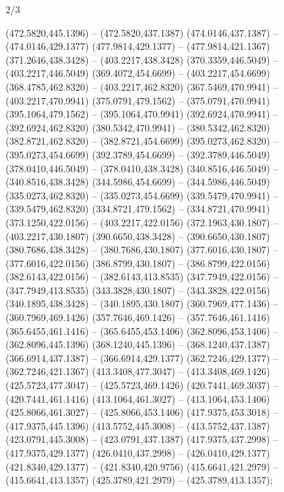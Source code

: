 \begin{flagdescription}{2/3}
\begin{scope}[xshift=0.5\flaglength,yshift=0.5\flagwidth,scale=\flagwidth/562]
\begin{scope}[y=1pt, x=1pt, yscale=-1,shift={(-421.88,-281.25)}]
 (472.5820,445.1396) -- (472.5820,437.1387) (474.0146,437.1387) -- (474.0146,429.1377)
 (477.9814,429.1377) -- (477.9814,421.1367) (371.2646,438.3428) -- (403.2217,438.3428)
 (370.3359,446.5049) -- (403.2217,446.5049) (369.4072,454.6699) -- (403.2217,454.6699)
 (368.4785,462.8320) -- (403.2217,462.8320) (367.5469,470.9941) -- (403.2217,470.9941)
 (375.0791,479.1562) -- (375.0791,470.9941) (395.1064,479.1562) -- (395.1064,470.9941)
 (392.6924,470.9941) -- (392.6924,462.8320) (380.5342,470.9941) -- (380.5342,462.8320)
 (382.8721,462.8320) -- (382.8721,454.6699) (395.0273,462.8320) -- (395.0273,454.6699)
 (392.3789,454.6699) -- (392.3789,446.5049) (378.0410,446.5049) -- (378.0410,438.3428)
 (340.8516,446.5049) -- (340.8516,438.3428) (344.5986,454.6699) -- (344.5986,446.5049)
 (335.0273,462.8320) -- (335.0273,454.6699) (339.5479,470.9941) -- (339.5479,462.8320)
 (334.8721,479.1562) -- (334.8721,470.9941) (373.1250,422.0156) -- (403.2217,422.0156)
 (372.1963,430.1807) -- (403.2217,430.1807) (390.6650,438.3428) -- (390.6650,430.1807)
 (380.7686,438.3428) -- (380.7686,430.1807) (377.6016,430.1807) -- (377.6016,422.0156)
 (386.8799,430.1807) -- (386.8799,422.0156) (382.6143,422.0156) -- (382.6143,413.8535)
 (347.7949,422.0156) -- (347.7949,413.8535) (343.3828,430.1807) -- (343.3828,422.0156)
 (340.1895,438.3428) -- (340.1895,430.1807) (360.7969,477.1436) -- (360.7969,469.1426)
 (357.7646,469.1426) -- (357.7646,461.1416) (365.6455,461.1416) -- (365.6455,453.1406)
 (362.8096,453.1406) -- (362.8096,445.1396) (368.1240,445.1396) -- (368.1240,437.1387)
 (366.6914,437.1387) -- (366.6914,429.1377) (362.7246,429.1377) -- (362.7246,421.1367)
 (413.3408,477.3047) -- (413.3408,469.1426) (425.5723,477.3047) -- (425.5723,469.1426)
 (420.7441,469.3037) -- (420.7441,461.1416) (413.1064,461.3027) -- (413.1064,453.1406)
 (425.8066,461.3027) -- (425.8066,453.1406) (417.9375,453.3018) -- (417.9375,445.1396)
 (413.5752,445.3008) -- (413.5752,437.1387) (423.0791,445.3008) -- (423.0791,437.1387)
 (417.9375,437.2998) -- (417.9375,429.1377) (426.0410,437.2998) -- (426.0410,429.1377)
 (421.8340,429.1377) -- (421.8340,420.9756) (415.6641,421.2979) -- (415.6641,413.1357)
 (425.3789,421.2979) -- (425.3789,413.1357);


\end{scope}
\end{scope}
\end{flagdescription}
